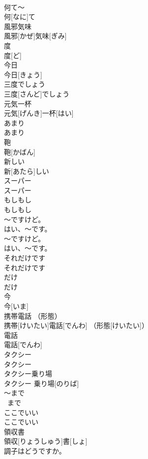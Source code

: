 \documentclass[8pt]{extreport}
\begin{document}
\begin{CJK}{UTF8}{min}
\\	何て～	
\\	何[なに]て~
\\	風邪気味	
\\	風邪[かぜ]気味[ぎみ]
\\	度	
\\	度[ど]
\\	今日	
\\	今日[きょう]
\\	三度でしょう	
\\	三度[さんど]でしょう
\\	元気一杯	
\\	元気[げんき]一杯[はい]
\\	あまり	
\\	あまり
\\	鞄	
\\	鞄[かばん]
\\	新しい	
\\	新[あたら]しい
\\	スーパー	
\\	スーパー
\\	もしもし	
\\	もしもし
\\	～ですけど。 
\\	はい、～です。	
\\	～ですけど。 
\\	はい、～です。
\\	それだけです	
\\	それだけです
\\	だけ	
\\	だけ
\\	今	
\\	今[いま]
\\	携帯電話 （形態）	
\\	携帯[けいたい]電話[でんわ] （形態[けいたい]）
\\	電話	
\\	電話[でんわ]
\\	タクシー	
\\	タクシー
\\	タクシー乗り場	
\\	タクシー 乗り場[のりば]
\\	～まで	
\\	~まで
\\	ここでいい	
\\	ここでいい
\\	領収書	
\\	領収[りょうしゅう]書[しょ]
\\	調子はどうですか。	

\end{CJK}
\end{document}
